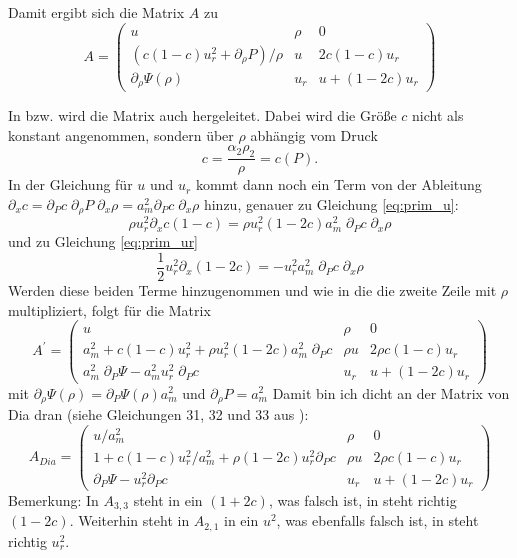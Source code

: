 Damit ergibt sich die Matrix $A$ zu
\begin{equation}
A = \left(\begin{array}{ccc}
u & \rho & 0\\[2mm]
(c (1-c) u_r^2 + \partial_{\rho} P)/\rho  & u & 2 c (1-c)  u_r \\[2mm]
\partial_{\rho} \Psi(\rho)  & u_r & u + (1-2c) u_r 
\end{array}\right)
\end{equation}

In \cite{dia_diss} bzw.  \cite{dia_2009} wird die Matrix auch
hergeleitet. Dabei wird die Größe $c$ nicht als konstant angenommen,
sondern über $\rho$ abhängig vom Druck
\[
c = \frac{\alpha_2\rho_2}{\rho} = c(P).
\]
In der Gleichung für $u$ und $u_r$ kommt dann noch ein Term von der
Ableitung $\partial_x c = \partial_P c\; \partial_\rho P\; \partial_x
\rho = a_m^2 \partial_P c \; \partial_x \rho $ hinzu, genauer zu
Gleichung \ref{eq:prim_u}:
\[
\rho  u_r^2 \partial_x c (1-c)  = \rho  u_r^2 (1-2c) a_m^2  \; \partial_P c \; \partial_x \rho  
\]
und zu Gleichung  \ref{eq:prim_ur}
\[
 \frac{1}{2}u_r^2 \partial_x (1-2c) = - u_r^2  a_m^2  \; \partial_P c \; \partial_x \rho 
\]
Werden diese beiden Terme hinzugenommen und wie in \cite{dia_2009} die
die zweite Zeile mit $\rho$ multipliziert, folgt für die Matrix
\begin{equation}
A ^\prime  = \left(\begin{array}{ccc}
u & \rho & 0\\[2mm]
a_m^2 + c (1-c) u_r^2 +  \rho  u_r^2 (1-2c) a_m^2 \;  \partial_P c    & \rho u & 2 \rho c (1-c)  u_r \\[2mm]
 a_m^2 \; \partial_{P} \Psi -  a_m^2 u_r^2  \;  \partial_P c & u_r & u + (1-2c) u_r 
\end{array}\right)
\end{equation}
mit $\partial_{\rho} \Psi(\rho) = \partial_{P} \Psi(\rho) a_m^2 $ und $ \partial_{\rho} P = a_m^2$
Damit bin ich dicht an der Matrix von Dia dran (siehe Gleichungen 31, 32
und 33 aus \cite{dia_2009}):
\begin{equation}
A_{Dia} = \left(\begin{array}{ccc}
u /a_m^{2}& \rho & 0\\[2mm]
1+c(1-c) u_r^2 / a_m^2 + \rho (1-2c) u_r^2\partial_P c  & \rho u & 2 \rho c (1-c)  u_r \\[2mm]
\partial_P \Psi - u_r^2 \partial_P  c  & u_r & u + (1-2c) u_r 
\end{array}\right)
\end{equation}
Bemerkung: In $A_{3,3}$ steht in \cite{dia_2009} ein $(1+2c)$, was
falsch ist, in \cite{dia_diss} steht richtig $(1-2c)$. Weiterhin steht
in $A_{2,1}$ in \cite{dia_2009} ein $u^2$, was ebenfalls falsch ist, in
\cite{dia_diss} steht richtig $u_r^2$.


